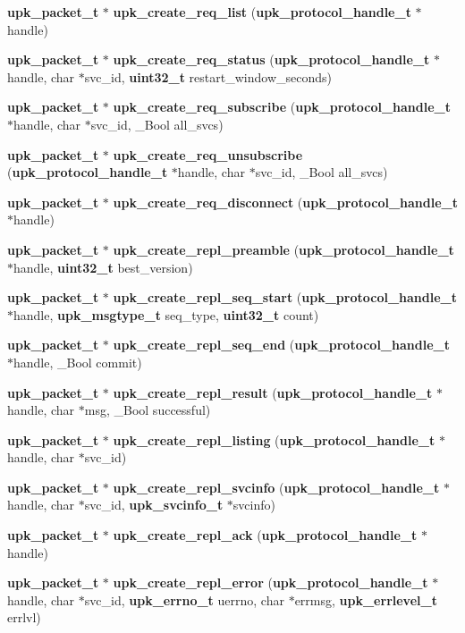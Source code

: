 \begin{DoxyCompactItemize}
{\bf upk\_\-packet\_\-t} $\ast$ {\bf upk\_\-create\_\-req\_\-list} ({\bf upk\_\-protocol\_\-handle\_\-t} $\ast$handle)
\item 
{\bf upk\_\-packet\_\-t} $\ast$ {\bf upk\_\-create\_\-req\_\-status} ({\bf upk\_\-protocol\_\-handle\_\-t} $\ast$handle, char $\ast$svc\_\-id, {\bf uint32\_\-t} restart\_\-window\_\-seconds)
\item 
{\bf upk\_\-packet\_\-t} $\ast$ {\bf upk\_\-create\_\-req\_\-subscribe} ({\bf upk\_\-protocol\_\-handle\_\-t} $\ast$handle, char $\ast$svc\_\-id, \_\-Bool all\_\-svcs)
\item 
{\bf upk\_\-packet\_\-t} $\ast$ {\bf upk\_\-create\_\-req\_\-unsubscribe} ({\bf upk\_\-protocol\_\-handle\_\-t} $\ast$handle, char $\ast$svc\_\-id, \_\-Bool all\_\-svcs)
\item 
{\bf upk\_\-packet\_\-t} $\ast$ {\bf upk\_\-create\_\-req\_\-disconnect} ({\bf upk\_\-protocol\_\-handle\_\-t} $\ast$handle)
\item 
{\bf upk\_\-packet\_\-t} $\ast$ {\bf upk\_\-create\_\-repl\_\-preamble} ({\bf upk\_\-protocol\_\-handle\_\-t} $\ast$handle, {\bf uint32\_\-t} best\_\-version)
\item 
{\bf upk\_\-packet\_\-t} $\ast$ {\bf upk\_\-create\_\-repl\_\-seq\_\-start} ({\bf upk\_\-protocol\_\-handle\_\-t} $\ast$handle, {\bf upk\_\-msgtype\_\-t} seq\_\-type, {\bf uint32\_\-t} count)
\item 
{\bf upk\_\-packet\_\-t} $\ast$ {\bf upk\_\-create\_\-repl\_\-seq\_\-end} ({\bf upk\_\-protocol\_\-handle\_\-t} $\ast$handle, \_\-Bool commit)
\item 
{\bf upk\_\-packet\_\-t} $\ast$ {\bf upk\_\-create\_\-repl\_\-result} ({\bf upk\_\-protocol\_\-handle\_\-t} $\ast$handle, char $\ast$msg, \_\-Bool successful)
\item 
{\bf upk\_\-packet\_\-t} $\ast$ {\bf upk\_\-create\_\-repl\_\-listing} ({\bf upk\_\-protocol\_\-handle\_\-t} $\ast$handle, char $\ast$svc\_\-id)
\item 
{\bf upk\_\-packet\_\-t} $\ast$ {\bf upk\_\-create\_\-repl\_\-svcinfo} ({\bf upk\_\-protocol\_\-handle\_\-t} $\ast$handle, char $\ast$svc\_\-id, {\bf upk\_\-svcinfo\_\-t} $\ast$svcinfo)
\item 
{\bf upk\_\-packet\_\-t} $\ast$ {\bf upk\_\-create\_\-repl\_\-ack} ({\bf upk\_\-protocol\_\-handle\_\-t} $\ast$handle)
\item 
{\bf upk\_\-packet\_\-t} $\ast$ {\bf upk\_\-create\_\-repl\_\-error} ({\bf upk\_\-protocol\_\-handle\_\-t} $\ast$handle, char $\ast$svc\_\-id, {\bf upk\_\-errno\_\-t} uerrno, char $\ast$errmsg, {\bf upk\_\-errlevel\_\-t} errlvl)

\end{DoxyCompactItemize}
